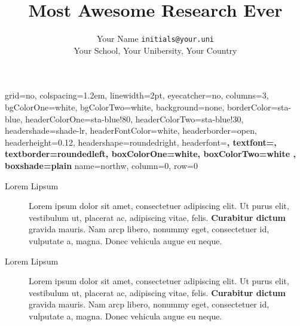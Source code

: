 \documentclass[pdftex, british, 
a0paper,
landscape,
fontscale=0.46
]{baposter}
\title{Most Awesome Research Ever}
\author{%
Your Name \texttt{initials@your.uni}\\[0.3em]%
Your School, Your Unibersity, Your Country%
}
\newcommand{\zoom}[1]{\textcolor{sta-blue}{\textbf{#1}}}
\begin{document}
\begin{poster}{
 grid=no,           %
 colspacing=1.2em,  %
 linewidth=2pt,
 eyecatcher=no,     %
 columns=3,         %
 bgColorOne=white,  %
 bgColorTwo=white,  %
 background=none,   %
 borderColor=sta-blue, %
 headerColorOne=sta-blue!80, %
 headerColorTwo=sta-blue!30, %
 headershade=shade-lr,        %
 headerFontColor=white,
 headerborder=open,
 headerheight=0.12\textheight,
 headershape=roundedright,
 headerfont=\Large\sffamily\bfseries,
 textfont=\sffamily,
 textborder=roundedleft,
 boxColorOne=white,      %
 boxColorTwo=white ,     %
 boxshade=plain             %
}
{ }
{\sffamily\Huge\thetitle\vspace{0.2em}}
{\sffamily\theauthor}
          {name=northw, column=0, row=0}
{
\begin{description}
\item[Lorem Lipsum] Lorem ipsum dolor sit amet, consectetuer
  adipiscing elit. Ut purus elit, vestibulum ut, placerat ac,
  adipiscing vitae, felis. \zoom{Curabitur dictum} gravida
  mauris. Nam arcp libero, nonummy eget, consectetuer id, vulputate a,
  magna. Donec vehicula augue eu neque. 

\item[Lorem Lipsum] Lorem ipsum dolor sit amet, consectetuer
  adipiscing elit. Ut purus elit, vestibulum ut, placerat ac,
  adipiscing vitae, felis. \zoom{Curabitur dictum} gravida
  mauris. Nam arcp libero, nonummy eget, consectetuer id, vulputate a,
  magna. Donec vehicula augue eu neque. 


\end{description}}
\end{poster}
\end{document}
